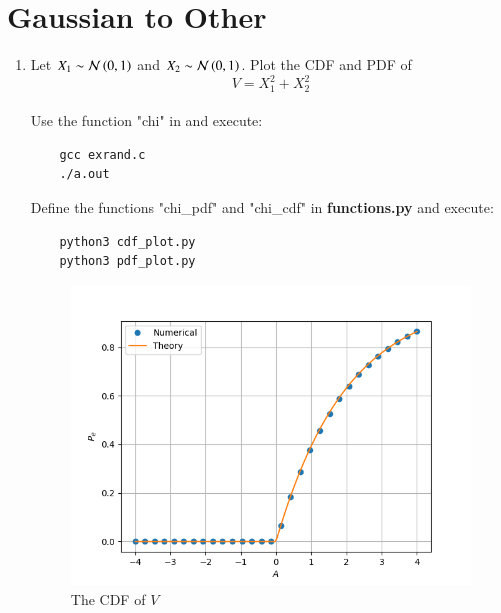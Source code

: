 \documentclass[journal,12pt,twocolumn]{IEEEtran}
\renewcommand\thesection{\arabic{section}}
\begin{document}
\section{Gaussian to Other}
\begin{enumerate}[label=\thesection.\arabic*
,ref=\thesection.\theenumi]
\item
Let $X_1 \sim  \mathcal{N}\left(0,1\right)$ and $X_2 \sim  \mathcal{N}\left(0,1\right)$. Plot the CDF and PDF of
%
\begin{equation}
V = X_1^2 + X_2^2
\end{equation}
%
%
%
\\
\solution Use the function "chi" in  and execute:

\begin{lstlisting}
    gcc exrand.c
    ./a.out
\end{lstlisting}

Define the functions "chi\_pdf" and "chi\_cdf" in \textbf{functions.py} and execute:

\begin{lstlisting}
    python3 cdf_plot.py
    python3 pdf_plot.py
\end{lstlisting}


\begin{figure}
    \centering
    \includegraphics[width=\columnwidth]{./figures/CDF_chi.png}
    \caption{The CDF of $V$}
    \label{fig:chi_cdf}
    \end{figure}


\end{enumerate}
\end{document}
